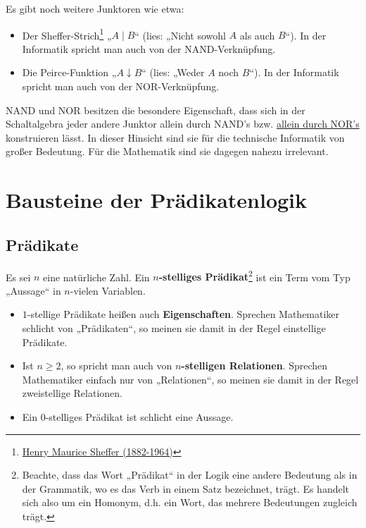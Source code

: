 	
\begin{vorschau}
    Es gibt noch weitere Junktoren wie etwa:
    \begin{itemize}
        \item Der Sheffer-Strich\footnote{\href{https://de.wikipedia.org/wiki/Henry_Maurice_Sheffer}{Henry Maurice Sheffer (1882-1964)}} „$A\mid B$“ (lies: „Nicht sowohl $A$ als auch $B$“). In der Informatik spricht man auch von der NAND-Verknüpfung.
        \item Die Peirce-Funktion „$A\downarrow B$“ (lies: „Weder $A$ noch $B$“). In der Informatik spricht man auch von der NOR-Verknüpfung.
    \end{itemize}
    NAND und NOR besitzen die besondere Eigenschaft, dass sich in der Schaltalgebra jeder andere Junktor allein durch NAND's bzw. \href{https://de.wikipedia.org/wiki/NOR-Gatter#Logiksynthese}{allein durch NOR's} konstruieren lässt. In dieser Hinsicht sind sie für die technische Informatik von großer Bedeutung. Für die Mathematik sind sie dagegen nahezu irrelevant.
\end{vorschau}




	
\section{Bausteine der Prädikatenlogik}


\subsection*{Prädikate}


\begin{de}[Prädikat] \label{def:praedikat}  
    Es sei $n$ eine natürliche Zahl. Ein \textbf{$n$-stelliges Prädikat}\footnote{Beachte, dass das Wort „Prädikat“ in der Logik eine andere Bedeutung als in der Grammatik, wo es das Verb in einem Satz bezeichnet, trägt. Es handelt sich also um ein Homonym, d.h. ein Wort, das mehrere Bedeutungen zugleich trägt.} ist ein Term vom Typ „Aussage“ in $n$-vielen Variablen.
    \begin{itemize}
        \item $1$-stellige Prädikate heißen auch \textbf{Eigenschaften}. Sprechen Mathematiker schlicht von „Prädikaten“, so meinen sie damit in der Regel einstellige Prädikate.
        \item Ist $n\ge 2$, so spricht man auch von \textbf{$n$-stelligen Relationen}. Sprechen Mathematiker einfach nur von „Relationen“, so meinen sie damit in der Regel zweistellige Relationen.
        \item Ein $0$-stelliges Prädikat ist schlicht eine Aussage.
    \end{itemize}
\end{de}


